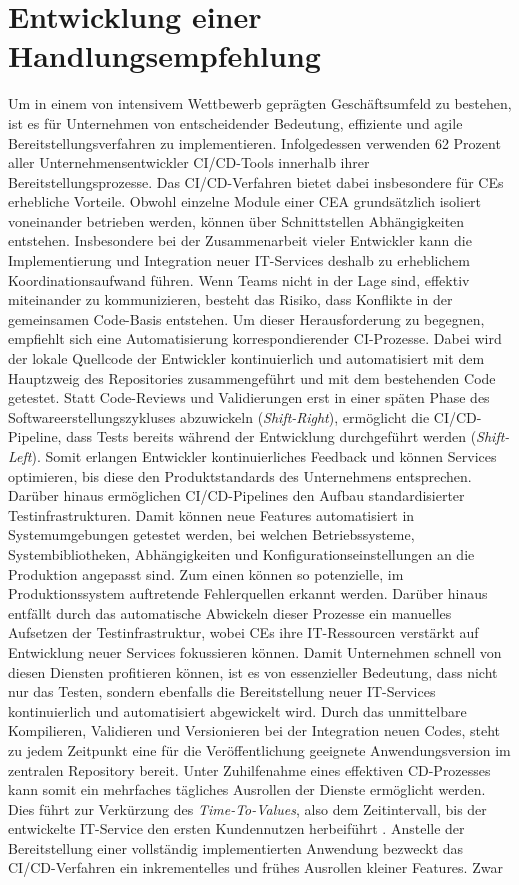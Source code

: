 
\section{Entwicklung einer Handlungsempfehlung}
\label{sec:Handlungsempfehlung}
Um in einem von intensivem Wettbewerb geprägten Geschäftsumfeld zu bestehen, ist es für Unternehmen von entscheidender Bedeutung, effiziente und agile Bereitstellungsverfahren zu implementieren. Infolgedessen verwenden 62 Prozent aller Unternehmensentwickler CI/CD-Tools innerhalb ihrer Bereitstellungsprozesse. Das CI/CD-Verfahren bietet dabei insbesondere für CEs erhebliche Vorteile. Obwohl einzelne Module einer CEA grundsätzlich isoliert voneinander betrieben werden, können über Schnittstellen Abhängigkeiten entstehen. Insbesondere bei der Zusammenarbeit vieler Entwickler kann die Implementierung und Integration neuer IT-Services deshalb zu erheblichem Koordinationsaufwand führen. Wenn Teams nicht in der Lage sind, effektiv miteinander zu kommunizieren, besteht das Risiko, dass Konflikte in der gemeinsamen Code-Basis entstehen. Um dieser Herausforderung zu begegnen, empfiehlt sich eine Automatisierung korrespondierender CI-Prozesse. Dabei wird der lokale Quellcode der Entwickler kontinuierlich und automatisiert mit dem Hauptzweig des Repositories zusammengeführt und mit dem bestehenden Code getestet. Statt Code-Reviews und Validierungen erst in einer späten Phase des Softwareerstellungszykluses abzuwickeln (\textit{Shift-Right}), ermöglicht die CI/CD-Pipeline, dass Tests bereits während der Entwicklung durchgeführt werden (\textit{Shift-Left}). Somit erlangen Entwickler kontinuierliches Feedback und können Services optimieren, bis diese den Produktstandards des Unternehmens entsprechen. Darüber hinaus ermöglichen CI/CD-Pipelines den Aufbau standardisierter Testinfrastrukturen. Damit können neue Features automatisiert in Systemumgebungen getestet werden, bei welchen Betriebssysteme, Systembibliotheken, Abhängigkeiten und Konfigurationseinstellungen an die Produktion angepasst sind. Zum einen können so potenzielle, im Produktionssystem auftretende Fehlerquellen erkannt werden. Darüber hinaus entfällt durch das automatische Abwickeln dieser Prozesse ein manuelles Aufsetzen der Testinfrastruktur, wobei CEs ihre IT-Ressourcen verstärkt auf Entwicklung neuer Services fokussieren können. Damit Unternehmen schnell von diesen Diensten profitieren können, ist es von essenzieller Bedeutung, dass nicht nur das Testen, sondern ebenfalls die Bereitstellung neuer IT-Services kontinuierlich und automatisiert abgewickelt wird. Durch das unmittelbare Kompilieren, Validieren und Versionieren bei der Integration neuen Codes, steht zu jedem Zeitpunkt eine für die Veröffentlichung geeignete Anwendungsversion im zentralen Repository bereit. Unter Zuhilfenahme eines effektiven CD-Prozesses kann somit ein mehrfaches tägliches Ausrollen der Dienste ermöglicht werden. Dies führt zur Verkürzung des \textit{Time-To-Values}, also dem Zeitintervall, bis der entwickelte IT-Service den ersten Kundennutzen herbeiführt \cite{Prof.Dr.RalfT.Kreutzer.20180215}. Anstelle der Bereitstellung einer vollständig implementierten Anwendung bezweckt das CI/CD-Verfahren ein inkrementelles und frühes Ausrollen kleiner Features. Zwar 
